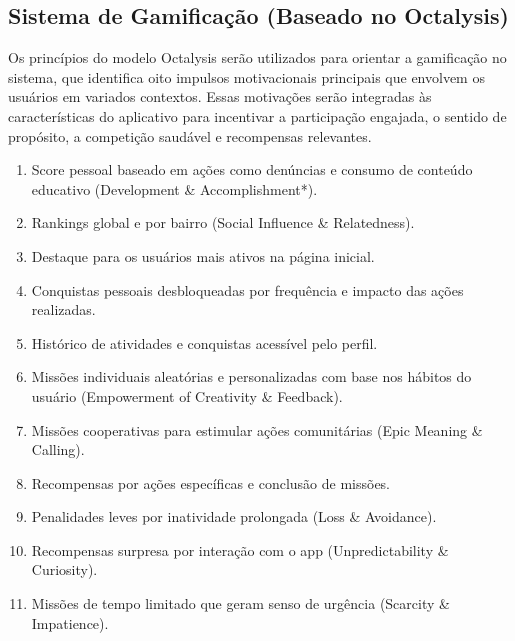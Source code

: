 \documentclass[a5paper, 12pt]{article}
\begin{document}
\subsection{Sistema de Gamificação (Baseado no Octalysis)}
Os princípios do modelo Octalysis serão utilizados para orientar a gamificação no sistema, que identifica oito impulsos motivacionais principais que envolvem os usuários em variados contextos. Essas motivações serão integradas às características do aplicativo para incentivar a participação engajada, o sentido de propósito, a competição saudável e recompensas relevantes.
\begin{enumerate}
    \item Score pessoal baseado em ações como denúncias e consumo de conteúdo educativo (Development \& Accomplishment*).
    \item Rankings global e por bairro (Social Influence \& Relatedness).
    \item Destaque para os usuários mais ativos na página inicial.
    \item Conquistas pessoais desbloqueadas por frequência e impacto das ações realizadas.
    \item Histórico de atividades e conquistas acessível pelo perfil.
    \item Missões individuais aleatórias e personalizadas com base nos hábitos do usuário (Empowerment of Creativity \& Feedback).
    \item Missões cooperativas para estimular ações comunitárias (Epic Meaning \& Calling).
    \item Recompensas por ações específicas e conclusão de missões.
    \item Penalidades leves por inatividade prolongada (Loss \& Avoidance).
    \item Recompensas surpresa por interação com o app (Unpredictability \& Curiosity).
    \item Missões de tempo limitado que geram senso de urgência (Scarcity \& Impatience).
\end{enumerate}
\end{document}
